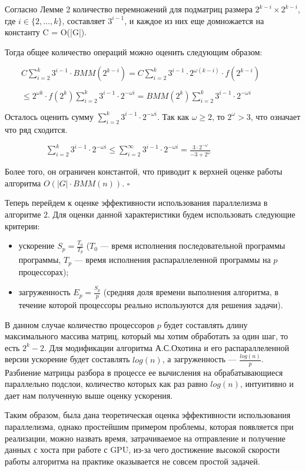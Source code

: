 \documentclass[14pt]{matmex-diploma}
\begin{document}
Согласно Лемме 2 количество перемножений для подматриц размера $2^{k - i} \times 2^{k - i}$, где $i \in \{2, \ldots, k\}$, составляет $3^{i - 1}$, и каждое из них еще домножается на константу C = O(|G|).

Тогда общее количество операций можно оценить следующим образом: 

$\quad \quad C \sum\limits_{i=2}^k 3^{i - 1}\cdot BMM(2^{k - i}) = C \sum\limits_{i=2}^k 3^{i - 1}\cdot 2^{\omega (k - i)}  \cdot f(2^{k - i})$ 

$\quad \quad \leq 2^{\omega k}  \cdot f(2^{k}) \sum\limits_{i=2}^k 3^{i - 1}\cdot 2^{-\omega i} = BMM(2^k) \sum\limits_{i=2}^k 3^{i - 1}\cdot 2^{-\omega i}$

Осталось оценить сумму $\sum\limits_{i=2}^k 3^{i - 1}\cdot 2^{-\omega i}$. Так как $\omega \geq 2$, то $2^{\omega} > 3$, что означает что ряд сходится. 

$\quad \quad \quad \quad \quad \sum\limits_{i=2}^k 3^{i - 1}\cdot 2^{-\omega i} \leq \sum\limits_{i=2}^{\infty} 3^{i - 1}\cdot 2^{-\omega i} = \frac{3 \cdot 2^{-\omega}} {-3 + 2^{\omega}} $

Более того, он ограничен константой, что приводит к верхней оценке работы алгоритма $O(|G|\cdot BMM(n))$. $\square$

Теперь перейдем к оценке эффективности использования параллелизма в алгоритме 2. Для оценки данной характеристики будем использовать следующие критерии:
\begin{itemize}
\item ускорение $S_p = \frac{T_0}{T_p}$ ($T_0$ --- время исполнения последовательной программы программы, $T_p$ --- время исполнения распараллеленной программы на $p$ процессорах);
\item загруженность $E_p = \frac{S_p}{p}$ (средняя доля времени выполнения алгоритма, в течение которой процессоры реально используются для решения задачи).
\end{itemize}

В данном случае количество процессоров $p$ будет составлять длину максимального массива матриц, который мы хотим обработать за один шаг, то есть $2^{k} - 2$. Для модификации алгоритма А.С.Охотина и его распараллеленной версии ускорение будет составлять $log(n)$, а загруженность --- $\frac{log(n)}{p}$. Разбиение матрицы разбора в процессе ее вычисления на обрабатывающиеся параллельно подслои, количество которых как раз равно $log(n)$, интуитивно и дает нам полученную выше оценку ускорения.

Таким образом, была дана теоретическая оценка эффективности использования параллелизма, однако простейшим примером проблемы, которая появляется при реализации, можно назвать время, затрачиваемое на отправление и получение данных с хоста при работе с GPU, из-за чего достижение высокой скорости работы алгоритма на практике оказывается не совсем простой задачей.
\end{document}
